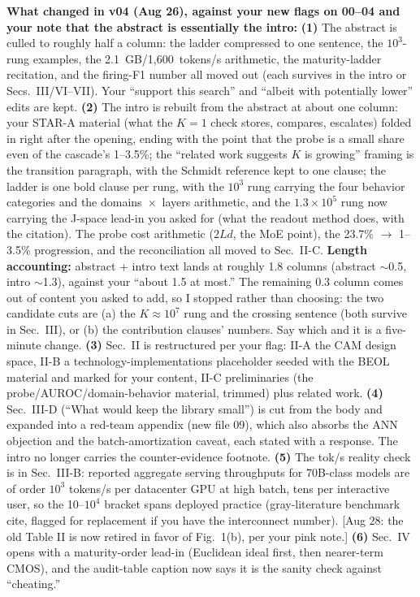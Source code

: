 \documentclass[conference]{IEEEtran}
\newcommand{\cam}{{CAM}\xspace}
\newcommand{\auroc}{{AUROC}\xspace}
\begin{document}
{\begin{pnote}[aiviolet]
\textbf{What changed in v04 (Aug 26), against your new flags on 00--04
and your note that the abstract is essentially the intro:}
{\bf (1)} The abstract is culled to roughly half a column: the ladder
compressed to one sentence, the $10^{3}$-rung examples, the
2.1~GB/1{,}600~tokens/s arithmetic, the maturity-ladder recitation,
and the firing-F1 number all moved out (each survives in the intro or
Secs.~III/VI--VII). Your ``support this search'' and ``albeit with
potentially lower'' edits are kept.
{\bf (2)} The intro is rebuilt from the abstract at about one column:
your STAR-A material (what the $K=1$ check stores, compares,
escalates) folded in right after the opening, ending with the point
that the probe is a small share even of the cascade's 1--3.5\%; the
``related work suggests $K$ is growing'' framing is the transition
paragraph, with the Schmidt reference kept to one clause; the ladder
is one bold clause per rung, with the $10^{3}$ rung carrying the four
behavior categories and the domains~$\times$~layers arithmetic, and
the $1.3\!\times\!10^{5}$ rung now carrying the J-space lead-in you
asked for (what the readout method does, with the citation). The probe
cost arithmetic ($2Ld$, the MoE point), the 23.7\% $\to$ 1--3.5\%
progression, and the reconciliation all moved to Sec.~II-C.
\textbf{Length accounting:} abstract + intro text lands at roughly
1.8 columns (abstract $\sim$0.5, intro $\sim$1.3), against your
``about 1.5 at most.'' The remaining 0.3 column comes out of content
you asked to add, so I stopped rather than choosing: the two candidate
cuts are (a) the $K\!\approx\!10^{7}$ rung and the crossing sentence
(both survive in Sec.~III), or (b) the contribution clauses' numbers.
Say which and it is a five-minute change.
{\bf (3)} Sec.~II is restructured per your flag: II-A the \cam design
space, II-B a technology-implementations placeholder seeded with the
BEOL material and marked for your content, II-C preliminaries (the
probe/\auroc/domain-behavior material, trimmed) plus related work.
{\bf (4)} Sec.~III-D (``What would keep the library small'') is cut
from the body and expanded into a red-team appendix (new file 09),
which also absorbs the ANN objection and the batch-amortization
caveat, each stated with a response. The intro no longer carries the
counter-evidence footnote.
{\bf (5)} The tok/s reality check is in Sec.~III-B: reported aggregate
serving throughputs for 70B-class models are of order $10^{3}$
tokens/s per datacenter GPU at high batch, tens per interactive user,
so the 10--$10^{4}$ bracket spans deployed practice
(gray-literature benchmark cite, flagged for replacement if you have
the interconnect number). [Aug 28: the old Table II is now retired in
favor of Fig.~1(b), per your pink note.]
{\bf (6)} Sec.~IV opens with a maturity-order lead-in (Euclidean
ideal first, then nearer-term CMOS), and the audit-table caption now
says it is the sanity check against ``cheating.''


\end{pnote}}
\end{document}
